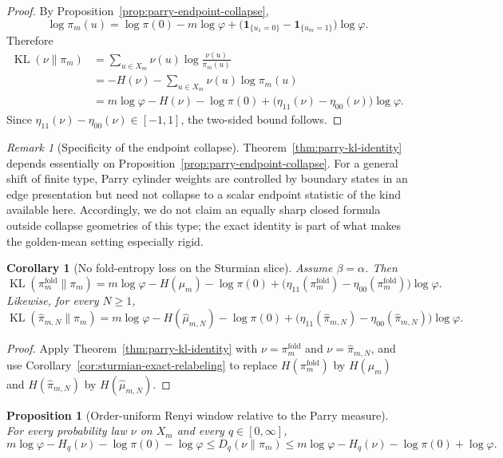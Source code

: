 \documentclass[11pt,letterpaper]{article}
\numberwithin{equation}{section}
\theoremstyle{plain}
\newtheorem{proposition}[theorem]{Proposition}
\newtheorem{corollary}[theorem]{Corollary}
\theoremstyle{definition}
\theoremstyle{remark}
\newtheorem{remark}[theorem]{Remark}
\DeclareMathOperator{\KL}{KL}
\begin{document}
\begin{proof}
By Proposition~\ref{prop:parry-endpoint-collapse},
\[
\log \pi_m(u)
=
\log\pi(0)-m\log\varphi
{}+\bigl(\mathbf{1}_{\{u_1=0\}}-\mathbf{1}_{\{u_m=1\}}\bigr)\log\varphi.
\]
Therefore
\[
\begin{aligned}
\KL(\nu\|\pi_m)
&=
\sum_{u\in X_m}\nu(u)\log\frac{\nu(u)}{\pi_m(u)}\\
&=
-H(\nu)-\sum_{u\in X_m}\nu(u)\log\pi_m(u)\\
&=
m\log\varphi-H(\nu)-\log\pi(0)
{}+\bigl(\eta_{11}(\nu)-\eta_{00}(\nu)\bigr)\log\varphi.
\end{aligned}
\]
Since \(\eta_{11}(\nu)-\eta_{00}(\nu)\in[-1,1]\), the two-sided bound follows.
\end{proof}

\begin{remark}[Specificity of the endpoint collapse]\label{rem:endpoint-collapse-specificity}
Theorem~\ref{thm:parry-kl-identity} depends essentially on
Proposition~\ref{prop:parry-endpoint-collapse}. For a general shift of finite
type, Parry cylinder weights are controlled by boundary states in an edge
presentation but need not collapse to a scalar endpoint statistic of the kind
available here. Accordingly, we do not claim an equally sharp closed formula
outside collapse geometries of this type; the exact identity is part of what
makes the golden-mean setting especially rigid.
\end{remark}

\begin{corollary}[No fold-entropy loss on the Sturmian slice]\label{cor:no-fold-entropy-loss}
Assume \(\beta=\alpha\). Then
\[
\KL(\pi_m^{\mathrm{fold}}\|\pi_m)
=
m\log\varphi-H(\mu_m)-\log\pi(0)
{}+\bigl(\eta_{11}(\pi_m^{\mathrm{fold}})
-\eta_{00}(\pi_m^{\mathrm{fold}})\bigr)\log\varphi.
\]
Likewise, for every \(N\ge 1\),
\[
\KL(\hat\pi_{m,N}\|\pi_m)
=
m\log\varphi-H(\hat\mu_{m,N})-\log\pi(0)
{}+\bigl(\eta_{11}(\hat\pi_{m,N})
-\eta_{00}(\hat\pi_{m,N})\bigr)\log\varphi.
\]
\end{corollary}

\begin{proof}
Apply Theorem~\ref{thm:parry-kl-identity} with
\(\nu=\pi_m^{\mathrm{fold}}\) and \(\nu=\hat\pi_{m,N}\), and use
Corollary~\ref{cor:sturmian-exact-relabeling} to replace
\(H(\pi_m^{\mathrm{fold}})\) by \(H(\mu_m)\) and
\(H(\hat\pi_{m,N})\) by \(H(\hat\mu_{m,N})\).
\end{proof}

\begin{proposition}[Order-uniform Renyi window relative to the Parry measure]
\label{prop:parry-renyi-window}
For every probability law \(\nu\) on \(X_m\) and every \(q\in[0,\infty]\),
\[
m\log\varphi-H_q(\nu)-\log\pi(0)-\log\varphi
\le
D_q(\nu\|\pi_m)
\le
m\log\varphi-H_q(\nu)-\log\pi(0)+\log\varphi.
\]
\end{proposition}
\end{document}
